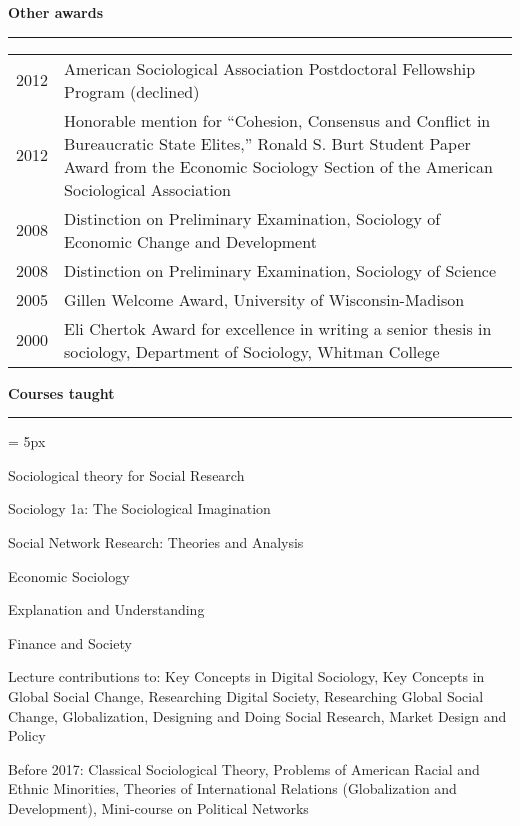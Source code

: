 \documentclass[12pt,letterpaper]{article}
\renewcommand{\labelitemi}{$$}
\newcommand{\sectionhead}[1]{\begin{flushleft}\large\bf{#1}\vspace{.1cm}\hrule\end{flushleft}}
\begin{document}
\sectionhead{Other awards}
\begin{tabulary}{.97\textwidth}{@{}p{2.5cm}  L}

2012 & American Sociological Association Postdoctoral Fellowship Program (declined)\\
2012 & Honorable mention for ``Cohesion, Consensus and Conflict in Bureaucratic State Elites,'' Ronald S. Burt Student Paper Award from the Economic Sociology Section of the American Sociological Association\\
2008 & Distinction on Preliminary Examination, Sociology of Economic Change and Development\\
2008 & Distinction on Preliminary Examination, Sociology of Science\\
2005 & Gillen Welcome Award, University of Wisconsin-Madison\\
2000 & Eli Chertok Award for excellence in writing a senior thesis in sociology, Department of Sociology, Whitman College\\
\end{tabulary}

\sectionhead{Courses taught}
\begin{list}{\labelitemi}{\leftmargin = 5px}
\item{Sociological theory for Social Research}
\item{Sociology 1a: The Sociological Imagination}
\item{Social Network Research: Theories and Analysis}
\item{Economic Sociology}
\item{Explanation and Understanding}
\item{Finance and Society}
\item{Lecture contributions to: Key Concepts in Digital Sociology, Key Concepts in Global Social Change, Researching Digital Society, Researching Global Social Change, Globalization, Designing and Doing Social Research, Market Design and Policy}
\item{Before 2017: Classical Sociological Theory, Problems of American Racial and Ethnic Minorities, Theories of International Relations (Globalization and Development), Mini-course on Political Networks} 
\end{list}




\end{document}

